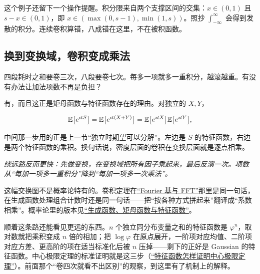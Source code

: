 这个例子还留下一个操作提醒。积分限来自两个支撑区间的交集：\(x\in(0,1)\) 且 \(s-x\in(0,1)\)，即 \(x\in(\max(0,s-1),\min(1,s))\)。照抄 \(\int_{-\infty}^{\infty}\) 会得到发散的积分。连续卷积算错，八成错在这里，不在被积函数。

\subsection{换到变换域，卷积变成乘法}

四段耗时之和要卷三次，八段要卷七次。每多一项就多一重积分，越滚越重。有没有办法让加法项数不再是负担？

有，而且这正是矩母函数与特征函数存在的理由。对独立的 \(X,Y\)，

\[
\mathbb{E}\bigl[e^{itS}\bigr]=\mathbb{E}\bigl[e^{it(X+Y)}\bigr]=\mathbb{E}\bigl[e^{itX}\bigr]\mathbb{E}\bigl[e^{itY}\bigr],
\]

中间那一步用的正是上一节``独立时期望可以分解''。左边是 \(S\) 的特征函数，右边是两个特征函数的乘积。换句话说，密度层面的卷积在变换层面就是逐点相乘。

\begin{center}

\emph{绕远路反而更快：先做变换，在变换域把所有因子乘起来，最后反演一次。项数从``每加一项多一重积分''降到``每加一项多一次乘法''。}
\end{center}

这幅交换图不是概率论特有的。卷积定理在\hyperref[sec:03-Linear-Algebra/08-Complex-Matrices-and-Fourier-Structure/03]{``Fourier 基与 FFT''}那里是同一句话，在生成函数处理组合计数时还是同一句话——把``按各种方式拼起来''翻译成``系数相乘''。概率论里的版本见\hyperref[sec:05-Probability/07-Transforms-and-Bounds/01]{``生成函数、矩母函数与特征函数''}。

顺着这条路还能看见更远的东西。\(n\) 个独立同分布变量之和的特征函数是 \(\varphi^n\)，取对数就把乘积变成 \(n\) 倍的相加；把 \(\log\varphi\) 在原点展开，一阶项对应均值、二阶项对应方差、更高阶的项在适当标准化后被 \(n\) 压掉——剩下的正好是 Gaussian 的特征函数。中心极限定理的标准证明就是这三步（\hyperref[sec:05-Probability/08-Limit-Theorems/04]{``特征函数怎样证明中心极限定理''}）。前面那个``卷四次就看不出区别''的观察，到这里有了机制上的解释。

